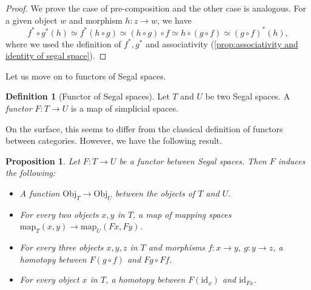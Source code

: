 \documentclass[11pt, a4paper]{amsart}
\newcommand{\map}{\mathrm{map}}
\newcommand{\id}{\mathrm{id}}
\newcommand{\Obj}{\mathrm{Obj}}
\newtheorem{proposition}[equation]{Proposition}
\theoremstyle{definition}
\newtheorem{definition}[equation]{Definition}
\theoremstyle{remark}
\numberwithin{equation}{section}
\begin{document}
\begin{proof}
 We prove the case of pre-composition and the other case is analogous. For a given object $w$ and morphism $h\colon z \to w$, we have 
 \[f^* \circ g^*(h) \simeq f^*(h \circ g) \simeq (h \circ g) \circ f \simeq h \circ (g \circ f)  \simeq (g \circ f)^*(h),\]
 where we used the definition of $f^*,g^*$ and associativity (\cref{prop:associativity and identity of segal space}).
\end{proof}

Let us move on to functors of Segal spaces. 

\begin{definition}[Functor of Segal spaces] \label{def:functor of segal spaces}
  Let $T$ and $U$ be two Segal spaces. A \emph{functor} $F\colon T \to U$ is a map of simplicial spaces.
\end{definition}

On the surface, this seems to differ from the classical definition of functors between categories. However, we have the following result.

\begin{proposition} \label{prop:functoriality}
  Let $F\colon T \to U$ be a functor between Segal spaces. Then $F$ induces the following:
  \begin{itemize}[leftmargin=*]
    \item A function $\Obj_T \to \Obj_U$ between the objects of $T$ and $U$.
    \item For every two objects $x,y$ in $T$, a map of mapping spaces $\map_T(x,y) \to \map_U(Fx,Fy)$.
    \item For every three objects $x,y,z$ in $T$ and morphisms $f\colon x \to y$, $g\colon y \to z$, a homotopy between $F(g \circ f)$ and $Fg \circ Ff$.
    \item For every object $x$ in $T$, a homotopy between $F(\id_x)$ and $\id_{Fx}$.
  \end{itemize}
\end{proposition}
\end{document}
